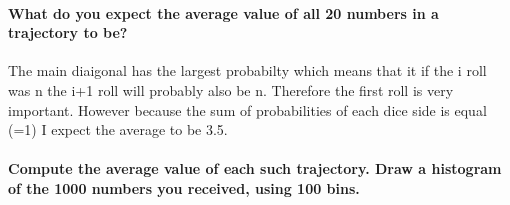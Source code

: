 \documentclass[11pt]{article}
\begin{document}
    \hypertarget{what-do-you-expect-the-average-value-of-all-20-numbers-in-a-trajectory-to-be}{%
\paragraph{What do you expect the average value of all 20 numbers in a
trajectory to
be?}\label{what-do-you-expect-the-average-value-of-all-20-numbers-in-a-trajectory-to-be}}

The main diaigonal has the largest probabilty which means that it if the
i roll was n the i+1 roll will probably also be n. Therefore the first
roll is very important. However because the sum of probabilities of each
dice side is equal (=1) I expect the average to be 3.5.

    \hypertarget{compute-the-average-value-of-each-such-trajectory.-draw-a-histogram-of-the-1000-numbers-you-received-using-100-bins.}{%
\paragraph{Compute the average value of each such trajectory. Draw a
histogram of the 1000 numbers you received, using 100
bins.}\label{compute-the-average-value-of-each-such-trajectory.-draw-a-histogram-of-the-1000-numbers-you-received-using-100-bins.}}
\end{document}
